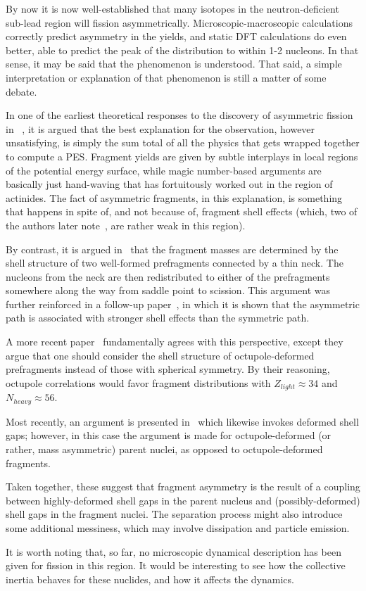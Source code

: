 By now it is now well-established that many isotopes in the neutron-deficient sub-lead region will fission asymmetrically. Microscopic-macroscopic calculations correctly predict asymmetry in the yields, and static DFT calculations do even better, able to predict the peak of the distribution to within 1-2 nucleons. In that sense, it may be said that the phenomenon is understood. That said, a simple interpretation or explanation of that phenomenon is still a matter of some debate.

In one of the earliest theoretical responses to the discovery of asymmetric fission in {\Hg}~\cite{Moller2012}, it is argued that the best explanation for the observation, however unsatisfying, is simply the sum total of all the physics that gets wrapped together to compute a PES. Fragment yields are given by subtle interplays in local regions of the potential energy surface, while magic number-based arguments are basically just hand-waving that has fortuitously worked out in the region of actinides. The fact of asymmetric fragments, in this explanation, is something that happens in spite of, and not because of, fragment shell effects (which, two of the authors later note~\cite{Ichikawa2012}, are rather weak in this region).

By contrast, it is argued in~\cite{Warda2012a} that the fragment masses are determined by the shell structure of two well-formed prefragments connected by a thin neck. The nucleons from the neck are then redistributed to either of the prefragments somewhere along the way from saddle point to scission. This argument was further reinforced in a follow-up paper~\cite{Mcdonnell2014}, in which it is shown that the asymmetric path is associated with stronger shell effects than the symmetric path.

A more recent paper~\cite{Scamps2018a} fundamentally agrees with this perspective, except they argue that one should consider the shell structure of octupole-deformed prefragments instead of those with spherical symmetry. By their reasoning, octupole correlations would favor fragment distributions with $Z_{light}\approx34$ and $N_{heavy}\approx56$.

Most recently, an argument is presented in~\cite{Ichikawa2019} which likewise invokes deformed shell gaps; however, in this case the argument is made for octupole-deformed (or rather, mass asymmetric) parent nuclei, as opposed to octupole-deformed fragments.

Taken together, these suggest that fragment asymmetry is the result of a coupling between highly-deformed shell gaps in the parent nucleus and (possibly-deformed) shell gaps in the fragment nuclei. The separation process might also introduce some additional messiness, which may involve dissipation and particle emission.

It is worth noting that, so far, no microscopic dynamical description has been given for fission in this region. It would be interesting to see how the collective inertia behaves for these nuclides, and how it affects the dynamics.

